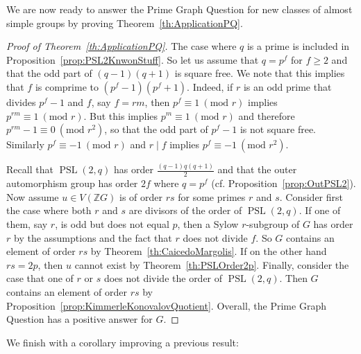 \documentclass[11pt, a4paper]{amsart}
\theoremstyle{definition}
\theoremstyle{definition}
\newcommand{\PSL}{{\operatorname{PSL}}}
\renewcommand{\geq}{\geqslant}
\begin{document}
We are now ready to answer the Prime Graph Question for new classes of almost simple groups by proving Theorem~\ref{th:ApplicationPQ}.

\begin{proof}[Proof of Theorem~\ref{th:ApplicationPQ}]
The case where $q$ is a prime is included in Proposition~\ref{prop:PSL2KnwonStuff}. So let us assume that $q=p^f$ for $f\geq 2$ and that the odd part of $(q-1)(q+1)$ is square free. We note that this implies that $f$ is comprime to $(p^f-1)(p^f+1)$. Indeed, if $r$ is an odd prime that divides $p^f-1$ and $f$, say $f = rm$, then $p^f \equiv 1 \ (\textrm{mod } r)$ implies $p^{rm} \equiv 1 \ (\textrm{mod } r)$. But this implies $p^m \equiv 1 \ (\textrm{mod } r)$ and therefore $p^{rm}-1 \equiv 0 \ (\textrm{mod } r^2)$, so that the odd part of $p^f-1$ is not square free. Similarly $p^f \equiv -1 \ (\textrm{mod } r)$ and $r \mid f$ implies $p^f \equiv -1 \ (\textrm{mod } r^2)$. 

Recall that $\PSL(2,q)$ has order $\frac{(q-1)q(q+1)}{2}$ and that the outer automorphism group has order $2f$ where $q=p^f$ (cf. Proposition~\ref{prop:OutPSL2}). Now assume $u \in V(\mathbb{Z}G)$ is of order $rs$ for some primes $r$ and $s$. Consider first the case where both $r$ and $s$ are divisors of the order of $\PSL(2,q)$. If one of them, say $r$, is odd but does not equal $p$, then a Sylow $r$-subgroup of $G$ has order $r$ by the assumptions and the fact that $r$ does not divide $f$. So $G$ contains an element of order $rs$ by Theorem~\ref{th:CaicedoMargolis}. If on the other hand $rs = 2p$, then $u$ cannot exist by Theorem~\ref{th:PSLOrder2p}. 
Finally, consider the case that one of $r$ or $s$ does not divide the order of $\PSL(2,q)$. Then $G$ contains an element of order $rs$ by Proposition~\ref{prop:KimmerleKonovalovQuotient}. Overall, the Prime Graph Question has a positive answer for $G$.
\end{proof}

We finish with a corollary improving a previous result:
\end{document}
